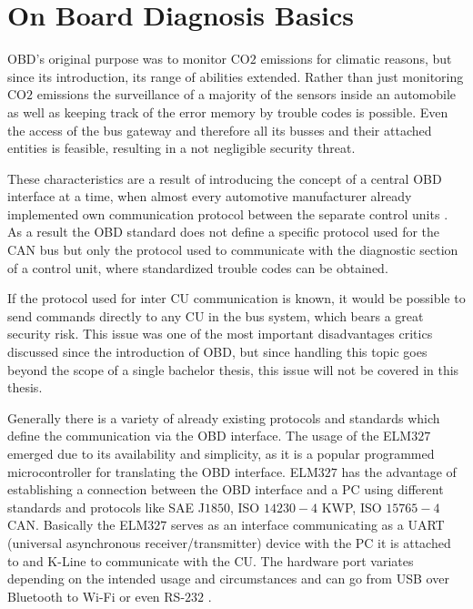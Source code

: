 

\chapter{On Board Diagnosis Basics}
\label{sec:OBDBASICS}
OBD's original purpose was to monitor CO$2$ emissions for climatic reasons, but since its introduction, its range of abilities 
extended. Rather than just monitoring CO$2$ emissions the surveillance of a majority of the sensors inside an automobile as well as 
keeping track of the error memory by trouble codes is possible. Even the access of the bus gateway and therefore all its busses and 
their attached entities is feasible, resulting in a not negligible security threat. 

These characteristics are a result of introducing the concept of a central OBD interface at a time, 
when almost every automotive manufacturer already implemented own communication protocol between the separate control units \cite{SCHAFOBD1}.
As a result the OBD standard does not define a specific protocol used for the CAN bus but only the protocol used to communicate with the diagnostic 
section of a control unit, where standardized trouble codes can be obtained. 

If the protocol used for inter CU communication is known, it would be possible to send commands directly to any CU in the bus system, which bears a 
great security risk. This issue was one of the most important disadvantages critics discussed since the introduction of OBD, but since handling
this topic goes beyond the scope of a single bachelor thesis, this issue will not be covered in this thesis\cite{Koscher2010}.

Generally there is a variety of already existing protocols and standards which define the communication via the OBD interface. The usage of the ELM$327$
emerged due to its availability and simplicity, as it is a popular programmed microcontroller for translating the OBD interface. ELM$327$ has the 
advantage of establishing a connection between the OBD interface and a PC using different standards and protocols like SAE J$1850$, ISO $14230-4$ KWP, 
ISO $15765-4$ CAN. Basically the ELM$327$ serves as an interface communicating as a UART (universal asynchronous receiver/transmitter) device with the 
PC it is attached to and K-Line to communicate with the CU. The hardware port variates depending on the intended usage and circumstances and can go 
from USB over Bluetooth to Wi-Fi or even RS-$232$ \cite[pp. 46 ff.]{SCHAFOBD2}.

